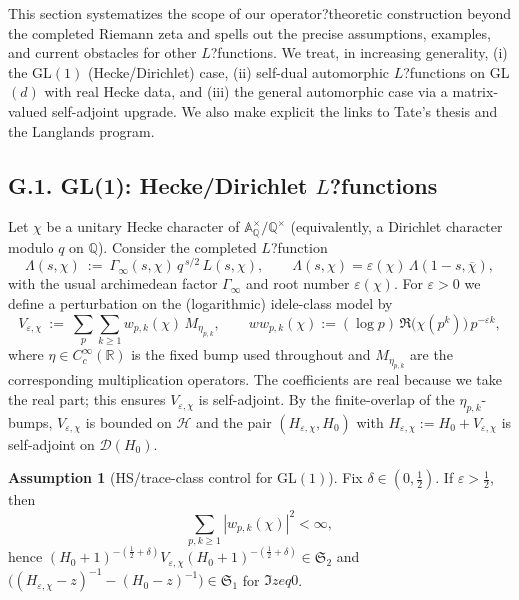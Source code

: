 ﻿\documentclass[12pt,a4paper]{article}
\theoremstyle{definition}
\newtheorem{assumption}[theorem]{Assumption}
\theoremstyle{remark}
\begin{document}
This section systematizes the scope of our operator?theoretic construction beyond the completed Riemann zeta and spells out the precise assumptions, examples, and current obstacles for other $L$?functions. We treat, in increasing generality, (i) the GL$(1)$ (Hecke/Dirichlet) case, (ii) self-dual automorphic $L$?functions on GL$(d)$ with real Hecke data, and (iii) the general automorphic case via a matrix-valued self-adjoint upgrade. We also make explicit the links to Tate's thesis and the Langlands program.

\subsection{G.1. GL(1): Hecke/Dirichlet \texorpdfstring{$L$}{L}?functions}

Let $\chi$ be a unitary Hecke character of $\mathbb A_\mathbb Q^\times/\mathbb Q^\times$ (equivalently, a Dirichlet character modulo $q$ on $\mathbb Q$). Consider the completed $L$?function
\begin{equation*}
\Lambda(s,\chi)\ :=\ \Gamma_\infty(s,\chi)\, q^{\,s/2}\, L(s,\chi),
\qquad
\Lambda(s,\chi)=\varepsilon(\chi)\,\Lambda(1-s,\overline{\chi}),
\end{equation*}
with the usual archimedean factor $\Gamma_\infty$ and root number $\varepsilon(\chi)$.
For $\varepsilon>0$ we define a perturbation on the (logarithmic) idele-class model by
\begin{equation*}
V_{\varepsilon,\chi}\ :=\ \sum_{p}\sum_{k\ge1} w_{p,k}(\chi)\,M_{\eta_{p,k}},
\qquad
w{w_{p,k}(\chi)}:=(\log p)\,\Re\big(\chi(p^k)\big)\,p^{-\varepsilon k},
\end{equation*}
where $\eta\in C_c^\infty(\mathbb R)$ is the fixed bump used throughout and $M_{\eta_{p,k}}$ are the corresponding multiplication operators. 
The coefficients are real because we take the real part; this ensures $V_{\varepsilon,\chi}$ is self-adjoint. 
By the finite-overlap of the $\eta_{p,k}$-bumps, $V_{\varepsilon,\chi}$ is bounded on $\mathcal H$ and the pair $(H_{\varepsilon,\chi},H_0)$ with $H_{\varepsilon,\chi}:=H_0+V_{\varepsilon,\chi}$ is self-adjoint on $\mathcal D(H_0)$. 

\begin{assumption}[HS/trace-class control for GL$(1)$]
\label{ass:GL1-HS}
Fix $\delta\in(0,\tfrac12)$.
If $\varepsilon>\tfrac12$, then
\begin{equation*}
\sum_{p,k\ge1} |w_{p,k}(\chi)|^{2} < \infty,
\end{equation*}
hence $(H_0+1)^{-(\frac12+\delta)}V_{\varepsilon,\chi}(H_0+1)^{-(\frac12+\delta)}\in\mathfrak S_2$ and 
$\big((H_{\varepsilon,\chi}-z)^{-1}-(H_0-z)^{-1}\big)\in\mathfrak S_1$ for $\Im z
eq0$.
\end{assumption}
\end{document}
